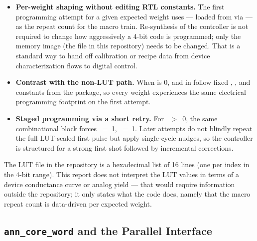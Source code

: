 \begin{itemize}
    \item \textbf{Per-weight shaping without editing RTL constants.}
          The first programming attempt for a given expected weight uses
           --- loaded
          from  via  --- as
          the repeat count  for the macro train. Re-synthesis
          of the controller is not required to change how aggressively
          a 4-bit code is programmed; only the memory image (the
          file in this repository) needs to be changed. That is a
          standard way to hand off calibration or recipe data from
          device characterization flows to digital control.
    \item \textbf{Contrast with the non-LUT path.} When
           is 0,
           and  in 
          follow fixed , , and
           constants from the package, so every weight
          experiences the same electrical programming footprint on the
          first attempt.
    \item \textbf{Staged programming via a short retry.} For
          ~\(>\)~0, the same combinational
          block forces ~=~1, ~=~1. Later attempts do not
          blindly repeat the full LUT-scaled first pulse but apply
          single-cycle nudges, so the controller is structured for a
          strong first shot followed by incremental corrections.
\end{itemize}

The LUT file in the repository is a hexadecimal list of 16 lines (one
per  index in the 4-bit range). This report
does not interpret the LUT values in terms of a device conductance
curve or analog yield --- that would require information outside the
repository; it only states what the code does, namely that the macro
repeat count is data-driven per expected weight.

\subsection{\texttt{ann\_core\_word} and the Parallel Interface}
\label{sec:analysis-annword}

